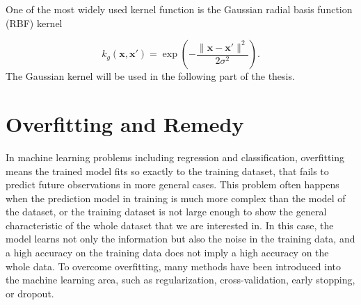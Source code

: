 One of the most widely used kernel function is the Gaussian radial basis function (RBF) kernel \cite{vert2004primer}

\begin{equation}
k_{g}(\mathbf{x}, \mathbf{x'}) = \exp\left(-\frac{\|\mathbf{x} - \mathbf{x'}\|^2}{2\sigma^2}\right).
\end{equation}
The Gaussian kernel will be used in the following part of the thesis.


\section{Overfitting and Remedy}


In machine learning problems including regression and classification, overfitting means the trained model fits so exactly to the training dataset, that fails to predict future observations in more general cases. This problem often happens when the prediction model in training is much more complex than the model of the dataset, or the training dataset is not large enough to show the general characteristic of the whole dataset that we are interested in. In this case, the model learns not only the information but also the noise in the training data, and a high accuracy on the training data does not imply a high accuracy on the whole data. To overcome overfitting, many methods have been introduced into the machine learning area, such as regularization, cross-validation, early stopping, or dropout.

